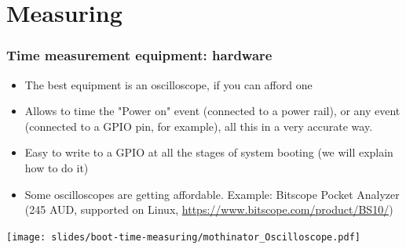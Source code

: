 \section{Measuring}

\begin{frame}
\frametitle{Time measurement equipment: hardware}
\begin{itemize}
\item The best equipment is an oscilloscope, if you can afford one
\item Allows to time the "Power on" event (connected to a power rail),
      or any event (connected to a GPIO pin, for example), all this
      in a very accurate way.
\item Easy to write to a GPIO at all the stages of system booting
      (we will explain how to do it)
\item Some oscilloscopes are getting affordable. Example: Bitscope
      Pocket Analyzer (245 AUD, supported on Linux, \url{https://www.bitscope.com/product/BS10/})
\end{itemize}
\begin{center}
    \texttt{[image: slides/boot-time-measuring/mothinator\_Oscilloscope.pdf]}
\end{center}
\end{frame}

